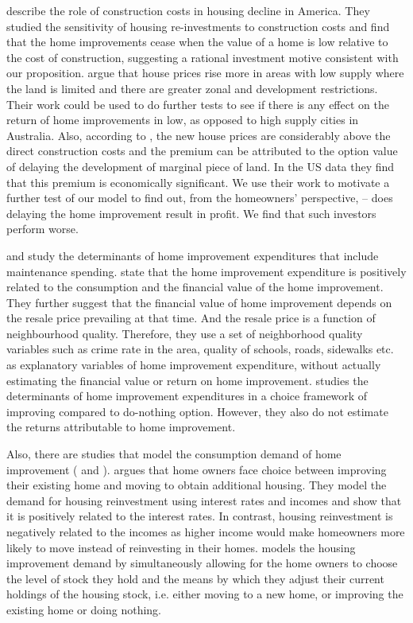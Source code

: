 \documentclass[AEJ,reqno, draftmode]{AEA} %
\begin{document}
\cite{gyourko2004reinvestment} describe the role of construction costs in housing decline in America. They studied the sensitivity of housing re-investments to construction costs and find that the home improvements cease when the value of a home is low relative to the cost of construction, suggesting a rational investment motive consistent with our proposition. \citet{glaeser2008housing} argue that house prices rise more in areas with low supply where the land is limited and there are greater zonal and development restrictions. Their work could be used to do further tests to see if there is any effect on the return of home improvements in low, as opposed to high supply cities in Australia. Also, according to \citet{guthrie2010house}, the new house prices are considerably above the direct construction costs and the premium can be attributed to the option value of delaying the development of marginal piece of land. In the US data they find that this premium is economically significant. We use their work to motivate a further test of our model to find out, from the homeowners' perspective, -- does delaying the home improvement result in profit. We find that such investors perform worse.  

\citet{boehm1986improvement} and \citet{galster1987homeowners} study the determinants of home improvement expenditures that include maintenance spending. \citet{boehm1986improvement} state that the home improvement expenditure is positively related to the consumption and the financial value of the home improvement. They further suggest that the financial value of home improvement depends on the resale price prevailing at that time. And the resale price is a function of neighbourhood quality. Therefore, they use a set of neighborhood quality variables such as crime rate in the area, quality of schools, roads, sidewalks etc. as explanatory variables of home improvement expenditure, without actually estimating the financial value or return on home improvement. \citet{galster1987homeowners} studies the determinants of home improvement expenditures in a choice framework of improving compared to do-nothing option. However, they also do not estimate the returns attributable to home improvement.

Also, there are studies that model the consumption demand of home improvement (\citet{potepan1989interest} and \citet{montgomery1992explaining}). \citet{potepan1989interest} argues that home owners face choice between improving their existing home and moving to obtain additional housing. They model the demand for housing reinvestment using interest rates and incomes and show that it is positively related to the interest rates. In contrast, housing reinvestment is negatively related to the incomes as higher income would make homeowners more likely to move instead of reinvesting in their homes. \citet{montgomery1992explaining} models the housing improvement demand by simultaneously allowing for the home owners to choose the level of stock they hold and the means by which they adjust their current holdings of the housing stock, i.e. either moving to a new home, or improving the existing home or doing nothing. 
\end{document}
